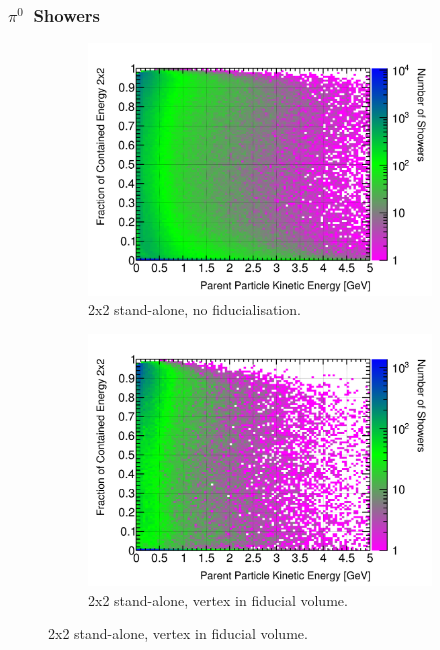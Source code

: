 \documentclass[10pt,a4paper,openany]{article}
\begin{document}
\subsubsection{$\pi^{0}$~Showers}
\begin{figure}[htbp]
	\centering
	\begin{subfigure}[b]{0.49\textwidth}
		\centering
		\includegraphics[width=1.0\textwidth]{Pi0_contained_frac_2x2.png}
		\caption{2x2 stand-alone, no fiducialisation.}
		\label{}
	\end{subfigure}	
	\hfill
	\begin{subfigure}[b]{0.49\textwidth}
		\centering
    \includegraphics[width=1.0\textwidth]{Pi0_contained_frac_2x2_fiducial.png}
		\caption{2x2 stand-alone, vertex in fiducial volume.}

\end{subfigure}
\end{figure}
\end{document}
